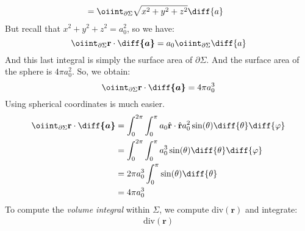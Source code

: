 \begin{solution}
\begin{subequations}
\begin{align}
                        &=\oiint_{\partial\Sigma}
                            \sqrt{x^{2}+y^{2}+z^{2}}\diff{a}
                    \end{align}
                \end{subequations}
                But recall that $x^{2}+y^{2}+z^{2}=a_{0}^{2}$,
                so we have:
                \begin{equation}
                    \oiint_{\partial\Sigma}\mathbf{r}
                    \cdot\boldsymbol{\diff{a}}
                    =a_{0}\oiint_{\partial\Sigma}\diff{a}\\
                \end{equation}
                And this last integral is simply the surface area
                of $\partial\Sigma$. And the surface area of the
                sphere is $4\pi{a_{0}^{2}}$. So, we obtain:
                \begin{equation}
                    \oiint_{\partial\Sigma}
                        \mathbf{r}\cdot\boldsymbol{\diff{a}}
                    =4\pi{a_{0}^{3}}
                \end{equation}
                Using spherical coordinates is much easier.
                \begin{subequations}
                    \begin{align}
                        \oiint_{\partial\Sigma}
                            \mathbf{r}\cdot\boldsymbol{\diff{a}}
                        &=\int_{0}^{2\pi}\int_{0}^{\pi}a_{0}
                            \hat{\mathbf{r}}\cdot
                            \hat{\mathbf{r}}a_{0}^{2}
                            \sin(\theta)\diff{\theta}\diff{\varphi}\\
                        &=\int_{0}^{2\pi}\int_{0}^{\pi}a_{0}^{3}
                            \sin(\theta)\diff{\theta}\diff{\varphi}\\
                        &=2\pi a_{0}^{3}\int_{0}^{\pi}
                            \sin(\theta)\diff{\theta}\\
                        &=4\pi{a_{0}^{3}}
                    \end{align}
                \end{subequations}
                To compute the \textit{volume integral}
                within $\Sigma$, we compute
                $\mathrm{div}(\mathbf{r})$ and integrate:
                \begin{subequations}
                    \begin{align}
                        \mathrm{div}(\mathbf{r})

\end{align}
\end{subequations}
\end{solution}
